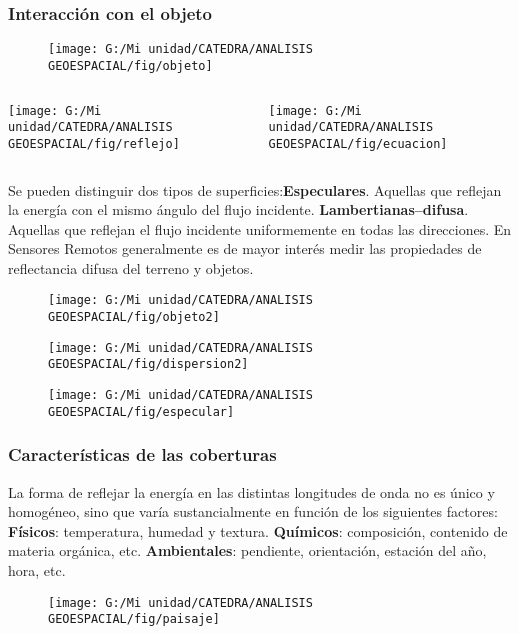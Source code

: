 \documentclass[14pt]{beamer}
\begin{document}
\begin{frame}
\frametitle{Interacción con el objeto}
  \begin{figure}
    \centering
    \texttt{[image: G:/Mi unidad/CATEDRA/ANALISIS GEOESPACIAL/fig/objeto]}
  \end{figure}
  \begin{columns}
	 	\begin{column}{.5\linewidth}
		 \texttt{[image: G:/Mi unidad/CATEDRA/ANALISIS GEOESPACIAL/fig/reflejo]}
		\end{column}
		\begin{column}{.5\linewidth}
		\texttt{[image: G:/Mi unidad/CATEDRA/ANALISIS GEOESPACIAL/fig/ecuacion]}
		\end{column}
	\end{columns}
\tiny{}
\end{frame}
\begin{frame}
\scriptsize{Se pueden distinguir dos tipos de superficies:\vfill\textbf{Especulares}. Aquellas que reflejan la energía con el mismo ángulo del flujo incidente.\vfill
\textbf{Lambertianas--difusa}.  Aquellas que reflejan el flujo incidente uniformemente en todas las direcciones. En Sensores Remotos generalmente es de mayor interés medir las propiedades de reflectancia difusa del terreno y objetos.} 
  \begin{figure}
    \centering
    \texttt{[image: G:/Mi unidad/CATEDRA/ANALISIS GEOESPACIAL/fig/objeto2]}
  \end{figure}
\tiny{}
\end{frame}
\begin{frame}
  \begin{figure}
    \centering
    \texttt{[image: G:/Mi unidad/CATEDRA/ANALISIS GEOESPACIAL/fig/dispersion2]}
  \end{figure}
\end{frame}
\begin{frame}
  \begin{figure}
    \centering
    \texttt{[image: G:/Mi unidad/CATEDRA/ANALISIS GEOESPACIAL/fig/especular]}
  \end{figure}
\end{frame}
\begin{frame}
\frametitle{Características de las coberturas}
\scriptsize{
La forma de reflejar la energía en las distintas longitudes de onda no es único y homogéneo, sino que varía sustancialmente en función de los siguientes factores:\vfill
\textbf{Físicos}: temperatura, humedad y textura.\vfill
\textbf{Químicos}: composición, contenido de materia orgánica, etc.\vfill
\textbf{Ambientales}: pendiente, orientación, estación del año, hora, etc.
}
 \begin{figure}
    \centering
    \texttt{[image: G:/Mi unidad/CATEDRA/ANALISIS GEOESPACIAL/fig/paisaje]}
  \end{figure}
\end{frame}
\end{document}
